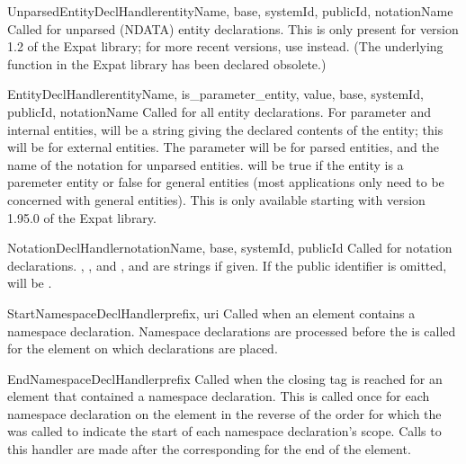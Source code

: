 \begin{methoddesc}[xmlparser]{UnparsedEntityDeclHandler}{entityName, base,
                                                         systemId, publicId,
                                                         notationName}
Called for unparsed (NDATA) entity declarations.  This is only present
for version 1.2 of the Expat library; for more recent versions, use
 instead.  (The underlying function in the
Expat library has been declared obsolete.)
\end{methoddesc}

\begin{methoddesc}[xmlparser]{EntityDeclHandler}{entityName,
                                                 is_parameter_entity, value,
                                                 base, systemId,
                                                 publicId,
                                                 notationName}
Called for all entity declarations.  For parameter and internal
entities,  will be a string giving the declared contents
of the entity; this will be  for external entities.  The
 parameter will be  for parsed entities,
and the name of the notation for unparsed entities.
 will be true if the entity is a paremeter
entity or false for general entities (most applications only need to
be concerned with general entities).
This is only available starting with version 1.95.0 of the Expat
library.
\end{methoddesc}

\begin{methoddesc}[xmlparser]{NotationDeclHandler}{notationName, base,
                                                   systemId, publicId}
Called for notation declarations.  , , and
, and  are strings if given.  If the
public identifier is omitted,  will be .
\end{methoddesc}

\begin{methoddesc}[xmlparser]{StartNamespaceDeclHandler}{prefix, uri}
Called when an element contains a namespace declaration.  Namespace
declarations are processed before the  is
called for the element on which declarations are placed.
\end{methoddesc}

\begin{methoddesc}[xmlparser]{EndNamespaceDeclHandler}{prefix}
Called when the closing tag is reached for an element 
that contained a namespace declaration.  This is called once for each
namespace declaration on the element in the reverse of the order for
which the  was called to indicate
the start of each namespace declaration's scope.  Calls to this
handler are made after the corresponding 
for the end of the element.
\end{methoddesc}

